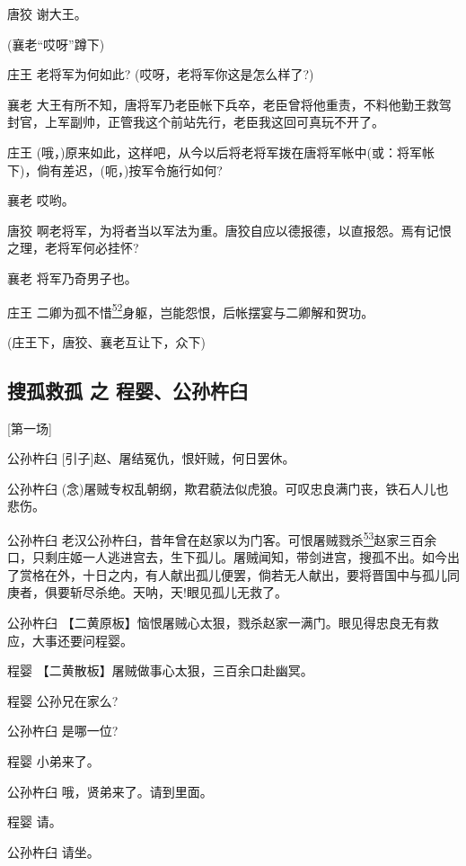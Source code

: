 唐狡 谢大王。

(襄老``哎呀''蹲下)

庄王 老将军为何如此? (哎呀，老将军你这是怎么样了?)

襄老
大王有所不知，唐将军乃老臣帐下兵卒，老臣曾将他重责，不料他勤王救驾封官，上军副帅，正管我这个前站先行，老臣我这回可真玩不开了。

庄王
(哦，)原来如此，这样吧，从今以后将老将军拨在唐将军帐中(或：将军帐下)，倘有差迟，(呃，)按军令施行如何?

襄老 哎哟。

唐狡
啊老将军，为将者当以军法为重。唐狡自应以德报德，以直报怨。焉有记恨之理，老将军何必挂怀?

襄老 将军乃奇男子也。

庄王
二卿为孤不惜\protect\hyperlink{fn52}{\textsuperscript{52}}身躯，岂能怨恨，后帐摆宴与二卿解和贺功。

(庄王下，唐狡、襄老互让下，众下)

\newpage
\hypertarget{ux641cux5b64ux6551ux5b64-ux4e4b-ux7a0bux5a74ux516cux5b59ux6775ux81fc}{%
\subsection{搜孤救孤 之
程婴、公孙杵臼}\label{ux641cux5b64ux6551ux5b64-ux4e4b-ux7a0bux5a74ux516cux5b59ux6775ux81fc}}

{[}第一场{]}

公孙杵臼 {[}引子{]}赵、屠结冤仇，恨奸贼，何日罢休。

公孙杵臼
(念)屠贼专权乱朝纲，欺君藐法似虎狼。可叹忠良满门丧，铁石人儿也悲伤。

公孙杵臼
老汉公孙杵臼，昔年曾在赵家以为门客。可恨屠贼戮杀\protect\hyperlink{fn53}{\textsuperscript{53}}赵家三百余口，只剩庄姬一人逃进宫去，生下孤儿。屠贼闻知，带剑进宫，搜孤不出。如今出了赏格在外，十日之内，有人献出孤儿便罢，倘若无人献出，要将晋国中与孤儿同庚者，俱要斩尽杀绝。天呐，天!眼见孤儿无救了。

公孙杵臼
【二黄原板】恼恨屠贼心太狠，戮杀赵家一满门。眼见得忠良无有救应，大事还要问程婴。

程婴 【二黄散板】屠贼做事心太狠，三百余口赴幽冥。

程婴 公孙兄在家么?

公孙杵臼 是哪一位?

程婴 小弟来了。

公孙杵臼 哦，贤弟来了。请到里面。

程婴 请。

公孙杵臼 请坐。

